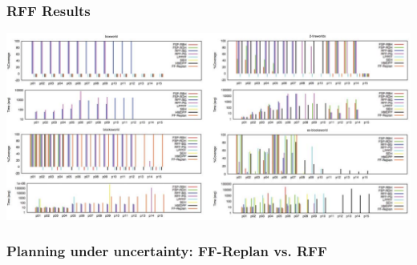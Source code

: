 \documentclass{beamer}
\let\origframetitle=\frametitle
\renewcommand\frametitle[1]{\origframetitle{\textbf{\large{\textrm{#1}}}}}
\begin{document}
\begin{frame}
  \frametitle{RFF Results}

  \includegraphics[width=\textwidth]{images/rff-results.pdf}

\end{frame}

\begin{frame}
  \frametitle{Planning under uncertainty: FF-Replan vs. RFF}
\end{frame}



\end{document}
